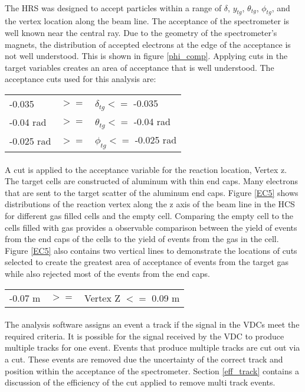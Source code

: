 \paragraph{} The HRS was designed to accept particles within a range of $\delta$, $y_{tg}$, $\theta_{tg}$, $\phi_{tg}$, and the vertex location along the beam line. The acceptance of the spectrometer is well known near the central ray. Due to the geometry of the spectrometer's magnets, the distribution of accepted electrons at the edge of the acceptance is not well understood. This is shown in figure \ref{phi_comp}. Applying cuts in the target variables creates an area of acceptance that is well understood. The acceptance cuts used for this analysis are:

\begin{tabular}{@{$\bullet$ }lll}
-0.035 &$ >=$ &$\delta_{tg} <=$ -0.035\\
-0.04 rad &$>=$  &$\theta_{tg} <=$ -0.04 rad\\
-0.025 rad &$>=$  &$\phi_{tg}   <=$ -0.025 rad
\end{tabular}

\paragraph{}A cut is applied to the acceptance variable for the reaction location, Vertex z. The target cells are constructed of aluminum with thin end caps. Many electrons that are sent to the target scatter of the aluminum end caps. Figure \ref{EC5} shows distributions of the reaction vertex along the z axis of the beam line in the HCS for different gas filled cells and the empty cell. Comparing the empty cell to the cells filled with gas provides a observable comparison between the yield of events from the end caps of the cells to the yield of events from the gas in the cell. Figure \ref{EC5} also contains two vertical lines to demonstrate the locations of cuts selected to create the greatest area of acceptance of events from the target gas while also rejected most of the events from the end caps.   

\begin{tabular}{@{$\bullet$ }lll}
  -0.07 m &$>=$& Vertex Z $<=$ 0.09 m
\end{tabular}

\paragraph{} The analysis software assigns an event a track if the signal in the VDCs meet the required criteria. It is possible for the signal received by the VDC to produce multiple tracks for one event. Events that produce multiple tracks are cut out via a cut. These events are removed due the uncertainty of the correct track and position within the acceptance of the spectrometer. Section \ref{eff_track} contains a discussion of the efficiency of the cut applied to remove multi track events. 

